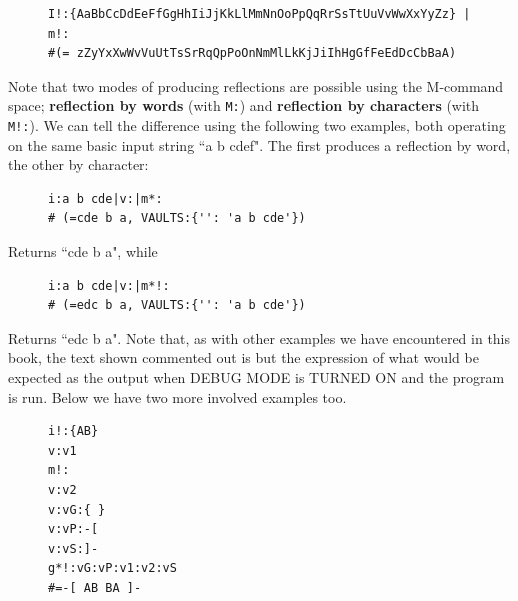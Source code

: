 \documentclass[a4paper, 18pt]{book} %
\begin{document}
\begin{figure}[H]
\Large
  \centering
  \begin{tcolorbox}[teaterminalstyle, title=M: EXAMPLE 1, breakable]
  \begin{lstlisting}[language=TEA,breaklines=true,]
I!:{AaBbCcDdEeFfGgHhIiJjKkLlMmNnOoPpQqRrSsTtUuVvWwXxYyZz} | m!:
#(= zZyYxXwWvVuUtTsSrRqQpPoOnNmMlLkKjJiIhHgGfFeEdDcCbBaA)
   \end{lstlisting}
  \end{tcolorbox}
\end{figure}


Note that two modes of producing reflections are possible using the M-command space; \textbf{reflection by words} (with \texttt{M:}) and \textbf{reflection by characters} (with \texttt{M!:}). We can tell the difference using the following two examples, both operating on the same basic input string ``a b cdef". The first produces a reflection by word, the other by character:




\begin{figure}[H]
 \Large
  \centering
  \begin{tcolorbox}[teaterminalstyle, title=M: EXAMPLE 2]
  \begin{lstlisting}[language=TEA]
i:a b cde|v:|m*:
# (=cde b a, VAULTS:{'': 'a b cde'}) 
   \end{lstlisting}
  \end{tcolorbox}
\end{figure}


Returns ``cde b a", while 



\begin{figure}[H]
 \Large
  \centering
  \begin{tcolorbox}[teaterminalstyle, title=M: EXAMPLE 3]
  \begin{lstlisting}[language=TEA]
i:a b cde|v:|m*!:
# (=edc b a, VAULTS:{'': 'a b cde'})
   \end{lstlisting}
  \end{tcolorbox}
\end{figure}


Returns ``edc b a". Note that, as with other examples we have encountered in this book, the text shown commented out is but the expression of what would be expected as the output when DEBUG MODE is TURNED ON and the program is run. Below we have two more involved examples too.


\begin{figure}[H]
 \Large
  \centering
  \begin{tcolorbox}[teaterminalstyle, title=M: EXAMPLE 4]
  \begin{lstlisting}[language=TEA]
i!:{AB}
v:v1
m!:
v:v2
v:vG:{ }
v:vP:-[
v:vS:]-
g*!:vG:vP:v1:v2:vS
#=-[ AB BA ]- 
   \end{lstlisting}
  \end{tcolorbox}
\end{figure}
\end{document}
